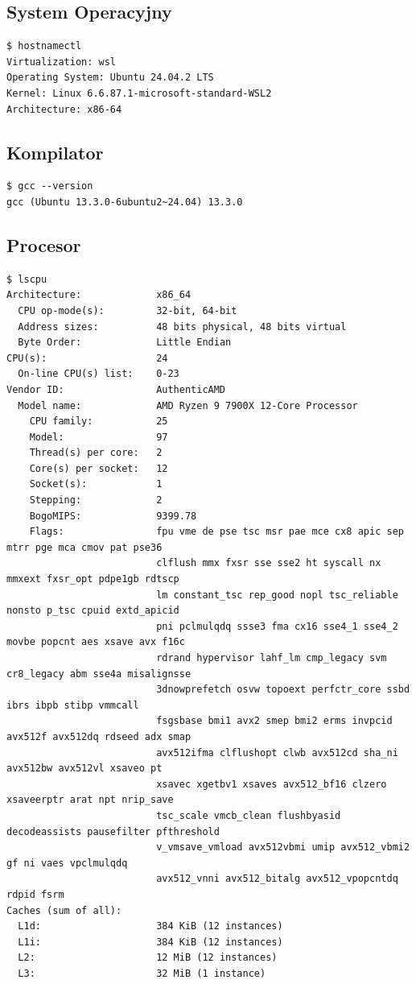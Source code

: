 \documentclass[12pt]{article}
\begin{document}
\subsection*{System Operacyjny}
\begin{verbatim}
$ hostnamectl
Virtualization: wsl
Operating System: Ubuntu 24.04.2 LTS
Kernel: Linux 6.6.87.1-microsoft-standard-WSL2
Architecture: x86-64
\end{verbatim}

\subsection*{Kompilator}
\begin{verbatim}
$ gcc --version
gcc (Ubuntu 13.3.0-6ubuntu2~24.04) 13.3.0
\end{verbatim}

\subsection*{Procesor}
\begin{verbatim}
$ lscpu
Architecture:             x86_64
  CPU op-mode(s):         32-bit, 64-bit
  Address sizes:          48 bits physical, 48 bits virtual
  Byte Order:             Little Endian
CPU(s):                   24
  On-line CPU(s) list:    0-23
Vendor ID:                AuthenticAMD
  Model name:             AMD Ryzen 9 7900X 12-Core Processor
    CPU family:           25
    Model:                97
    Thread(s) per core:   2
    Core(s) per socket:   12
    Socket(s):            1
    Stepping:             2
    BogoMIPS:             9399.78
    Flags:                fpu vme de pse tsc msr pae mce cx8 apic sep mtrr pge mca cmov pat pse36 
                          clflush mmx fxsr sse sse2 ht syscall nx mmxext fxsr_opt pdpe1gb rdtscp 
                          lm constant_tsc rep_good nopl tsc_reliable nonsto p_tsc cpuid extd_apicid 
                          pni pclmulqdq ssse3 fma cx16 sse4_1 sse4_2 movbe popcnt aes xsave avx f16c 
                          rdrand hypervisor lahf_lm cmp_legacy svm cr8_legacy abm sse4a misalignsse 
                          3dnowprefetch osvw topoext perfctr_core ssbd ibrs ibpb stibp vmmcall 
                          fsgsbase bmi1 avx2 smep bmi2 erms invpcid avx512f avx512dq rdseed adx smap 
                          avx512ifma clflushopt clwb avx512cd sha_ni avx512bw avx512vl xsaveo pt 
                          xsavec xgetbv1 xsaves avx512_bf16 clzero xsaveerptr arat npt nrip_save 
                          tsc_scale vmcb_clean flushbyasid decodeassists pausefilter pfthreshold 
                          v_vmsave_vmload avx512vbmi umip avx512_vbmi2 gf ni vaes vpclmulqdq 
                          avx512_vnni avx512_bitalg avx512_vpopcntdq rdpid fsrm
Caches (sum of all):      
  L1d:                    384 KiB (12 instances)
  L1i:                    384 KiB (12 instances)
  L2:                     12 MiB (12 instances)
  L3:                     32 MiB (1 instance)
\end{verbatim}
\end{document}
